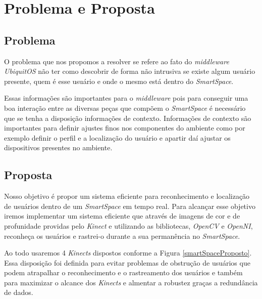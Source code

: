 \chapter{Problema e Proposta}


\section{Problema}
	O problema que nos propomos a resolver se refere ao fato do \textit{middleware} \textit{UbiquitOS} não ter como descobrir de forma não intrusiva se existe algum usuário presente, quem é esse usuário e onde o mesmo está dentro do \textit{SmartSpace}.

	Essas informações são importantes para o \textit{middleware} pois para conseguir uma boa interação entre as diversas peças que compõem o \textit{SmartSpace} é necessário que se tenha a disposição informações de contexto. Informações de contexto são importantes para definir ajustes finos nos componentes do ambiente como por exemplo definir o perfil e a localização do usuário e apartir daí ajustar os dispositivos presentes no ambiente.

\section{Proposta}

	Nosso objetivo é propor um sistema eficiente para reconhecimento e localização de usuários dentro de um \textit{SmartSpace} em tempo real. Para alcançar esse objetivo iremos implementar um sistema eficiente que através de imagens de cor e de profunidade providas pelo \textit{Kinect} e utilizando as bibliotecas, \textit{OpenCV} e \textit{OpenNI}, reconheça os usuários e rastrei-o durante a sua permanência no \textit{SmartSpace}.


	Ao todo usaremos 4 \textit{Kinects} dispostos conforme a Figura \ref{smartSpaceProposto}. Essa disposição foi definida para evitar problemas de obstrução de usuários que podem atrapalhar o reconhecimento e o rastreamento dos usuários e também para maximizar o alcance dos \textit{Kinects} e almentar a robustez graças a redundância de dados.

